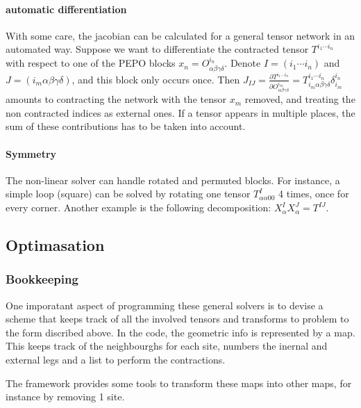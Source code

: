 \paragraph{automatic differentiation}
With some care, the jacobian can be calculated for a general tensor network in an automated way. Suppose we want to differentiate the contracted tensor $T^{i_1  \cdots i_n  }$ with respect to one of the PEPO blocks $x_n = O^{i_n }_{\alpha \beta \gamma \delta}$. Denote $I=(i_1 \cdots i_n )$ and $J=(i_m  \alpha \beta \gamma \delta)$, and this block only occurs once. Then $  J_{I J}  = \frac{\partial T^{i_1  \cdots i_n  } }{  \partial O^{i_m }_{\alpha \beta \gamma \delta} } = T^{i_1 \cdots i_n } _{ i_m  \alpha \beta \gamma \delta}  \delta^{i_n}_{i_m}   $  amounts to  contracting the network with the tensor $x_m$ removed, and treating the non contracted indices as external ones. If a tensor appears in multiple places, the sum of these contributions has to be taken into account.


\paragraph{Symmetry}

The non-linear solver can handle rotated and permuted blocks. For instance, a simple loop (square) can be solved by rotating one tensor $T^I_{ \alpha \alpha 0 0}$ 4 times, once for every corner. Another example is the following decomposition:  $  X^I_\alpha X^J_\alpha = T^{I J} $.

\subsection{Optimasation}

\subsubsection{Bookkeeping}

One imporatant aspect of programming these general solvers is to devise a scheme that keeps track of all the involved tensors and transforms to problem to the form discribed above. In the code, the geometric info is represented by a map. This keeps track of the neighbourghs for each site, numbers the inernal and external legs and a list to perform the contractions.

The framework provides some tools to transform these maps into other maps, for instance by removing 1 site.

